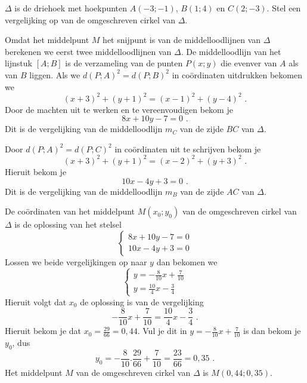 \begin{voorbeeld}
	$\Delta$ is de driehoek met hoekpunten $A(-3;-1)$, $B(1;4)$ en $C(2;-3)$.
Stel een vergelijking op van de omgeschreven cirkel van $\Delta$.



Omdat het middelpunt $M$ het snijpunt is van de middelloodlijnen van $\Delta$ berekenen we eerst twee middelloodlijnen van $\Delta$.
De middelloodlijn van het lijnstuk $[A;B]$ is de verzameling van de punten $P(x;y)$ die evenver van $A$ als van $B$ liggen.
Als we $d(P;A)^2=d(P;B)^2$ in co\"ordinaten uitdrukken bekomen we
\[
(x+3)^2+(y+1)^2=(x-1)^2+(y-4)^2 \text { .}
\]
Door de machten uit te werken en te vereenvoudigen bekom je
\[
8x+10y-7=0 \text { .}
\]
Dit is de vergelijking van de middelloodlijn $m_C$ van de zijde $BC$ van $\Delta$.

Door $d(P;A)^2=d(P;C)^2$ in co\"ordinaten uit te schrijven bekom je
\[
(x+3)^2+(y+1)^2=(x-2)^2+(y+3)^2 \text { .}
\]
Hieruit bekom je
\[
10x-4y+3=0 \text { .}
\]
Dit is de vergelijking van de middelloodlijn $m_B$ van de zijde $AC$ van $\Delta$.

De co\"ordinaten van het middelpunt $M(x_0;y_0)$ van de omgeschreven cirkel van $\Delta$ is de oplossing van het stelsel
\[
\begin{cases}
8x+10y-7=0\\
10x-4y+3=0
\end{cases}
\]
Lossen we beide vergelijkingen op naar $y$ dan bekomen we
\[
\begin{cases}
y=-\frac {8}{10}x+\frac {7}{10}\\
y=\frac {10}{4}x-\frac {3}{4}
\end{cases}
\]
Hieruit volgt dat $x_0$ de oplossing is van de vergelijking
\[
-\frac {8}{10}x+\frac {7}{10}=\frac {10}{4}x-\frac {3}{4} \text { .}
\]
Hieruit bekom je dat $x_0=\frac {29}{66}=0,44$.
Vul je dit in $y=-\frac {8}{10}x+\frac {7}{10}$ is dan bekom je $y_0$, dus
\[
y_0=-\frac {8}{10}.\frac {29}{66}+\frac {7}{10}=\frac {23}{66}=0,35 \text { .}
\]
Het middelpunt $M$ van de omgeschreven cirkel van $\Delta$ is $M(0,44;0,35)$.


\end{voorbeeld}
